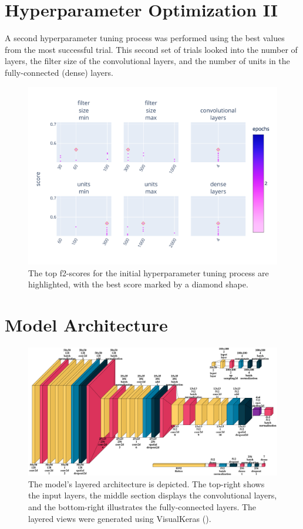 \section{Hyperparameter Optimization II}

A second hyperparameter tuning process was performed using the best values from the most successful trial. This second set of trials looked into the number of layers, the filter size of the convolutional layers, and the number of units in the fully-connected (dense) layers. 

\begin{figure}[ht]
    \centering
    \includegraphics[width=0.9\linewidth, trim={10pt 10pt 15pt 40pt}, clip]{figures/figures_tuner/hyperband_resnet_followup_params.pdf}
    \caption{The top f2-scores for the initial hyperparameter tuning process are highlighted, with the best score marked by a diamond shape.}
    \label{fig:hyperband_resnet_followup_params}
\end{figure}

\section{Model Architecture}

\begin{figure}[ht]
    \centering
    \includegraphics[width=0.9\linewidth]{figures/figures_tuner/model_layered_view.png}
    \caption{The model's layered architecture is depicted. The top-right shows the input layers, the middle section displays the convolutional layers, and the bottom-right illustrates the fully-connected layers. The layered views were generated using VisualKeras (\cite{visualkeras}).}
    \label{fig:model_layered_view}
\end{figure}

